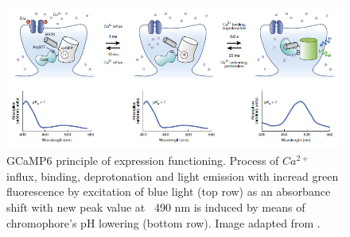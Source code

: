 \begin{figure}[h]
\center
\includegraphics[scale=0.75]{Figures/3.Chapter/GCamp6functioning.png}
\caption{GCaMP6 principle of expression functioning. Process of $Ca^{2+}$ influx, binding, deprotonation and light emission with incread green fluorescence by excitation of blue light (top row) as an absorbance shift with new peak value at ~490 nm is induced by means of chromophore's pH lowering (bottom row).  Image adapted from \cite{Lin2016}.}
\label{GCaMP6Functioning}
\end{figure}


